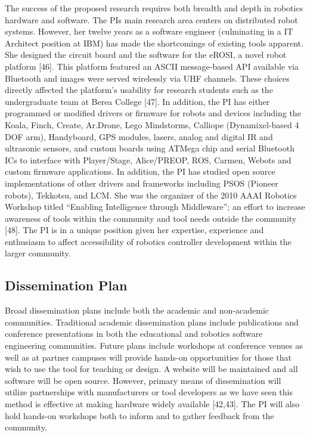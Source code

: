 The success of the proposed research requires both breadth and depth in robotics hardware and software.  The PIs main research area centers on distributed robot systems.  However, her twelve years as a software engineer (culminating in a IT Architect position at IBM) has made the shortcomings of existing tools apparent.  She designed the circuit board and the software for the eROSI, a novel robot platform [46].  This platform featured an ASCII message-based API available via Bluetooth and images were served wirelessly via UHF channels.  These choices directly affected the platform’s usability for research students such as the undergraduate team at Berea College [47].  In addition, the PI has either programmed or modified drivers or firmware for robots and devices including the Koala, Finch, Create, Ar.Drone, Lego Mindstorms, Calliope (Dynamixel-based 4 DOF arm), Handyboard, GPS modules, lasers, analog and digital IR and ultrasonic sensors, and custom boards using ATMega chip and serial Bluetooth ICs to interface with Player/Stage, Alice/PREOP, ROS, Carmen, Webots and custom firmware applications.  In addition, the PI has studied open source implementations of other drivers and frameworks including PSOS (Pioneer robots), Tekkotsu, and LCM.  She was the organizer of the 2010 AAAI Robotics Workshop titled “Enabling Intelligence through Middleware”; an effort to increase awareness of tools within the community and tool needs outside the community [48]. The PI is in a unique position given her expertise, experience and enthusiasm to affect accessibility of robotics controller development within the larger community.

\subsection{Dissemination Plan}
Broad dissemination plans include both the academic and non-academic communities.  Traditional academic dissemination plans include publications and conference presentations in both the educational and robotics software engineering communities.  Future plans include workshops at conference venues as well as at partner campuses will provide hands-on opportunities for those that wish to use the tool for teaching or design.  A website will be maintained and all software will be open source.  However, primary means of dissemination will utilize partnerships with manufacturers or tool developers as we have seen this method is effective at making hardware widely available [42,43].  The PI will also hold hands-on workshops both to inform and to gather feedback from the community.  

